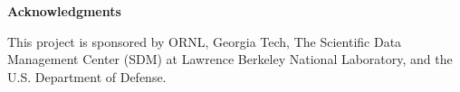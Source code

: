 

\vspace{18pt}
\begin{center}
{\large \textbf{Acknowledgments}}
\end{center}

\vspace{6pt}
This project is sponsored by ORNL, Georgia Tech, The Scientific Data Management 
Center (SDM) at Lawrence Berkeley National Laboratory, and the U.S. Department 
of Defense. 

